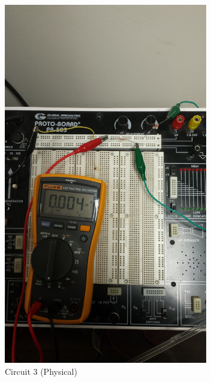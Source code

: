 \documentclass[12pt]{article}
\begin{document}
\begin{figure}[h!] %
   \centering
   \includegraphics[width=3.5in,angle=-90]{Circuit_3_real.jpg} 
   \caption{Circuit 3 (Physical)}
   \label{fig:example}
\end{figure}

\newpage
\end{document}
